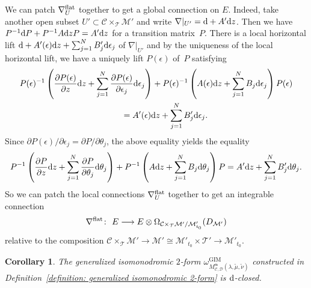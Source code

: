 \documentclass[pdftex]{sigma}
\numberwithin{equation}{section}
\newtheorem{Corollary}[Theorem]{Corollary}
\newcommand{\balpha}{\boldsymbol \alpha}
\begin{document}
We can patch $\nabla_U^{\rm flat}$ together to get a global connection on $E$.
Indeed, take another open subset $U'\subset{\mathcal C}\times_{\mathcal T}{\mathcal M'}$
and write $\nabla|_{U'}={\rm d}+A'{\rm d}z$.
Then we have
$P^{-1}{\rm d}P+P^{-1}A{\rm d}zP=A'{\rm d}z$
for a transition matrix~$P$.
There is a local horizontal lift ${\rm d}+A'(\epsilon){\rm d}z+\sum_{j=1}^NB'_j{\rm d}\epsilon_j$
of $\nabla|_{U'}$
and by the uniqueness of the local horizontal lift,
we have a uniquely lift $P(\epsilon)$ of~$P$
satisfying
\begin{gather*}
 P(\epsilon)^{-1}\left( \frac{\partial P(\epsilon)}{\partial z}{\rm d}z
 +\sum_{j=1}^N \frac{\partial P(\epsilon)}{\partial \epsilon_j} {\rm d}\epsilon_j \right)
 +P(\epsilon)^{-1} \left( A(\epsilon){\rm d}z+\sum_{j=1}^N B_j{\rm d}\epsilon_j \right) P(\epsilon)\\
 \qquad{}
 =A'(\epsilon){\rm d}z+\sum_{j=1}^NB'_j{\rm d}\epsilon_j.
\end{gather*}
Since
$\partial P(\epsilon)/\partial \epsilon_j
=\partial P/\partial \theta_j$,
the above equality yields the equality
\[
 P^{-1}\left( \frac{\partial P} {\partial z}{\rm d}z
 +\sum_{j=1}^N \frac{\partial P} {\partial \theta_j} {\rm d}\theta_j \right)
 +P^{-1} \left( A{\rm d}z+\sum_{j=1}^N B_j {\rm d}\theta_j \right) P
 =A'{\rm d}z+\sum_{j=1}^N B'_j {\rm d}\theta_j.
\]
So we can patch the local connections
$\nabla^{\rm flat}_U$ together
to get an integrable connection
\begin{equation} \label{global integrable connection analytic local over moduli}
 \nabla^{\rm flat} \colon \
 E \longrightarrow E\otimes
 \Omega_{{\mathcal C}\times_{\mathcal T}{\mathcal M'}/{\mathcal M}'_{t_0}}(D_{\mathcal M'})
\end{equation}
relative to the composition
${\mathcal C}\times_{\mathcal T}{\mathcal M'}
 \longrightarrow{\mathcal M'}\cong{\mathcal M}'_{t_0}\times{\mathcal T'}
 \longrightarrow {\mathcal M}'_{t_0}$.

\begin{Corollary} \label{corollary d-closedness of generalized isomonodromic 2-form}
The generalized isomonodromic $2$-form
$\omega_{M^{\balpha}_{{\mathcal C},{\mathcal D}}(\lambda,\tilde{\mu},\tilde{\nu})}^{\mathrm{GIM}}$
constructed in Definition~{\rm \ref{definition: generalized isomonodromic 2-form}} is ${\rm d}$-closed.
\end{Corollary}
\end{document}
